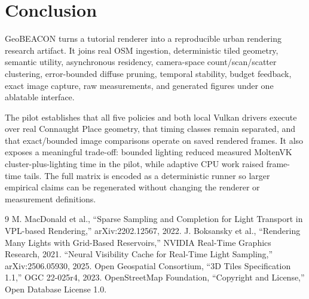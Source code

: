\documentclass[10pt,twocolumn]{article}
\begin{document}
\clearpage
\section{Conclusion}
GeoBEACON turns a tutorial renderer into a reproducible urban rendering research artifact. It joins
real OSM ingestion, deterministic tiled geometry, semantic utility, asynchronous residency,
camera-space count/scan/scatter clustering, error-bounded diffuse pruning, temporal stability,
budget feedback, exact image capture, raw measurements, and generated figures under one ablatable
interface.

The pilot establishes that all five policies and both local Vulkan drivers execute over real
Connaught Place geometry, that timing classes remain separated, and that exact/bounded image
comparisons operate on saved rendered frames. It also exposes a meaningful trade-off: bounded
lighting reduced measured MoltenVK cluster-plus-lighting time in the pilot, while adaptive CPU work
raised frame-time tails. The full matrix is encoded as a deterministic runner so larger empirical
claims can be regenerated without changing the renderer or measurement definitions.

\begin{thebibliography}{9}
 M. MacDonald et al., ``Sparse Sampling and Completion for Light Transport in
VPL-based Rendering,'' arXiv:2202.12567, 2022.
 J. Boksansky et al., ``Rendering Many Lights with Grid-Based Reservoirs,'' NVIDIA
Real-Time Graphics Research, 2021.
 ``Neural Visibility Cache for Real-Time Light Sampling,'' arXiv:2506.05930, 2025.
 Open Geospatial Consortium, ``3D Tiles Specification 1.1,'' OGC 22-025r4, 2023.
 OpenStreetMap Foundation, ``Copyright and License,'' Open Database License 1.0.
\end{thebibliography}
\end{document}
